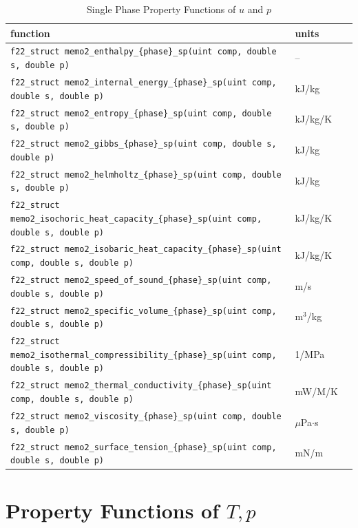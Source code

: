 \documentclass[oneside]{book}
\begin{document}
\begin{table}[h!]
\centering
\caption{Single Phase Property Functions of $u$ and $p$}
\begin{tabular}{ l l l }
\hline
function & units \\
\hline
\hline
\texttt{f22\_struct memo2\_enthalpy\_\{phase\}\_sp(uint comp, double s, double p)} & -- \\ [1ex]
\texttt{f22\_struct memo2\_internal\_energy\_\{phase\}\_sp(uint comp, double s, double p)} &  kJ/kg \\ [1ex]
\texttt{f22\_struct memo2\_entropy\_\{phase\}\_sp(uint comp, double s, double p)} &  kJ/kg/K \\ [1ex]
\texttt{f22\_struct memo2\_gibbs\_\{phase\}\_sp(uint comp, double s, double p)} &  kJ/kg \\ [1ex]
\texttt{f22\_struct memo2\_helmholtz\_\{phase\}\_sp(uint comp, double s, double p)} &  kJ/kg \\ [1ex]
\texttt{f22\_struct memo2\_isochoric\_heat\_capacity\_\{phase\}\_sp(uint comp, double s, double p)} &  kJ/kg/K \\ [1ex]
\texttt{f22\_struct memo2\_isobaric\_heat\_capacity\_\{phase\}\_sp(uint comp, double s, double p)} &  kJ/kg/K \\ [1ex]
\texttt{f22\_struct memo2\_speed\_of\_sound\_\{phase\}\_sp(uint comp, double s, double p)} &  m/s \\ [1ex]
\texttt{f22\_struct memo2\_specific\_volume\_\{phase\}\_sp(uint comp, double s, double p)} &  m$^3$/kg \\ [1ex]
\texttt{f22\_struct memo2\_isothermal\_compressibility\_\{phase\}\_sp(uint comp, double s, double p)} &  1/MPa \\ [1ex]
\texttt{f22\_struct memo2\_thermal\_conductivity\_\{phase\}\_sp(uint comp, double s, double p)} &  mW/M/K \\ [1ex]
\texttt{f22\_struct memo2\_viscosity\_\{phase\}\_sp(uint comp, double s, double p)} &  $\mu$Pa$\cdot$s \\ [1ex]
\texttt{f22\_struct memo2\_surface\_tension\_\{phase\}\_sp(uint comp, double s, double p)} &  mN/m \\ [1ex]
 \hline    
\end{tabular}
\label{table:single_up_props}
\end{table}

\section{Property Functions of $T, p$}
\end{document}
